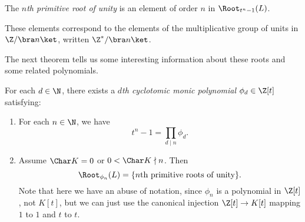 \documentclass[a4paper]{article}
\begin{document}
\begin{defi}
  The \emph{$n$th primitive root of unity} is an element of order $n$ in $\Root_{t^n - 1}(L)$.
\end{defi}
These elements correspond to the elements of the multiplicative group of units in $\Z/\bra n\ket$, written $\Z^*/\bra n\ket$.

The next theorem tells us some interesting information about these roots and some related polynomials.

\begin{thm}
  For each $d \in \N$, there exists a \emph{$d$th cyclotomic monic polynomial} $\phi_d \in \Z[t]$ satisfying:
  \begin{enumerate}
    \item For each $n \in \N$, we have
      \[
        t^n - 1 = \prod_{d \mid n} \phi_d.
      \]
    \item Assume $\Char K = 0$ or $0 < \Char K \nmid n$. Then
      \[
        \Root_{\phi_n}(L) = \{n\text{th primitive roots of unity}\}.
      \]
      Note that here we have an abuse of notation, since $\phi_n$ is a polynomial in $\Z[t]$, not $K[t]$, but we can just use the canonical injection $\Z[t] \to K[t]$ mapping $1$ to $1$ and $t$ to $t$.
  \end{enumerate}
\end{thm}
\end{document}
